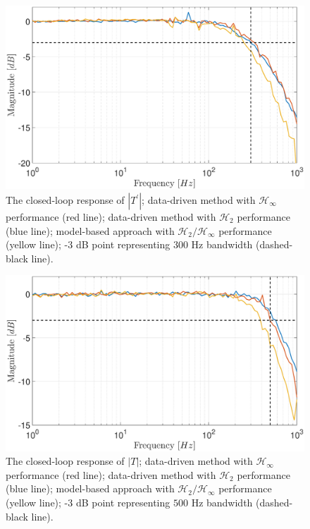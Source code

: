 \documentclass[a4paper, 10pt, conference]{ieeeconf}
\begin{document}
\begin{figure}
\centering
\includegraphics[width=\columnwidth]{../pics/d_loop_mag.eps}
\caption{The closed-loop response of $|T^{\prime}|$; data-driven method with $\mathcal{H}_{\infty}$ performance (red line); data-driven method with $\mathcal{H}_2$ performance (blue line); model-based approach with $\mathcal{H}_2 / \mathcal{H}_\infty$ performance (yellow line); -3 dB point representing 300 Hz bandwidth (dashed-black line).}
\label{fig:d_loop}
\end{figure} 

\begin{figure}
\centering
\includegraphics[width=\columnwidth]{../pics/v_loop_mag.eps}
\caption{The closed-loop response of $|T|$; data-driven method with $\mathcal{H}_{\infty}$ performance (red line); data-driven method with $\mathcal{H}_2$ performance (blue line); model-based approach with $\mathcal{H}_2 / \mathcal{H}_\infty$ performance (yellow line); -3 dB point representing $500$ Hz bandwidth (dashed-black line).}
\label{fig:v_loop}
\end{figure} 
\end{document}
